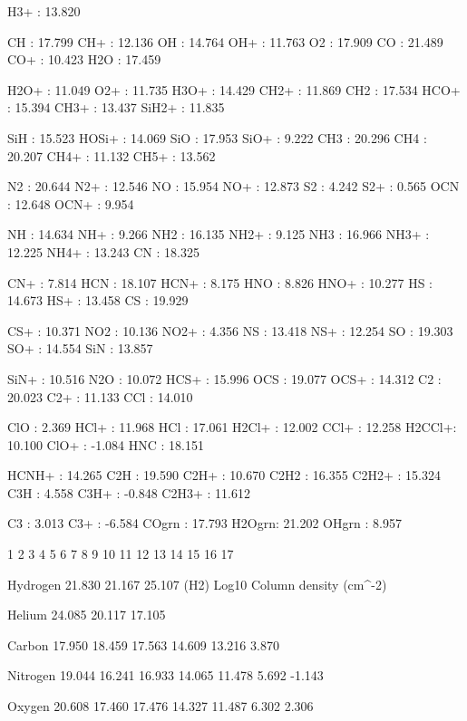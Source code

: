{   H3+   : 13.820

   CH    : 17.799   CH+   : 12.136   OH    : 14.764   OH+   : 11.763   O2
: 17.909   CO    : 21.489   CO+   : 10.423   H2O   : 17.459

   H2O+  : 11.049   O2+   : 11.735   H3O+  : 14.429   CH2+  : 11.869   CH2
: 17.534   HCO+  : 15.394   CH3+  : 13.437   SiH2+ : 11.835

   SiH   : 15.523   HOSi+ : 14.069   SiO   : 17.953   SiO+  :  9.222   CH3
: 20.296   CH4   : 20.207   CH4+  : 11.132   CH5+  : 13.562

   N2    : 20.644   N2+   : 12.546   NO    : 15.954   NO+   : 12.873   S2
:  4.242   S2+   :  0.565   OCN   : 12.648   OCN+  :  9.954

   NH    : 14.634   NH+   :  9.266   NH2   : 16.135   NH2+  :  9.125   NH3
: 16.966   NH3+  : 12.225   NH4+  : 13.243   CN    : 18.325

   CN+   :  7.814   HCN   : 18.107   HCN+  :  8.175   HNO   :  8.826   HNO+
: 10.277   HS    : 14.673   HS+   : 13.458   CS    : 19.929

   CS+   : 10.371   NO2   : 10.136   NO2+  :  4.356   NS    : 13.418   NS+
: 12.254   SO    : 19.303   SO+   : 14.554   SiN   : 13.857

   SiN+  : 10.516   N2O   : 10.072   HCS+  : 15.996   OCS   : 19.077   OCS+
: 14.312   C2    : 20.023   C2+   : 11.133   CCl   : 14.010

   ClO   :  2.369   HCl+  : 11.968   HCl   : 17.061   H2Cl+ : 12.002   CCl+
: 12.258   H2CCl+: 10.100   ClO+  : -1.084   HNC   : 18.151

   HCNH+ : 14.265   C2H   : 19.590   C2H+  : 10.670   C2H2  : 16.355   C2H2+
: 15.324   C3H   :  4.558   C3H+  : -0.848   C2H3+ : 11.612

   C3    :  3.013   C3+   : -6.584   COgrn : 17.793   H2Ogrn: 21.202   OHgrn
:  8.957

               1      2      3      4      5      6      7      8      9
10     11     12     13     14     15     16     17

 Hydrogen   21.830 21.167 25.107 (H2)                Log10 Column density
(cm^-2)

 Helium     24.085 20.117 17.105

 Carbon     17.950 18.459 17.563 14.609 13.216  3.870

 Nitrogen   19.044 16.241 16.933 14.065 11.478  5.692 -1.143

 Oxygen     20.608 17.460 17.476 14.327 11.487  6.302  2.306

}
